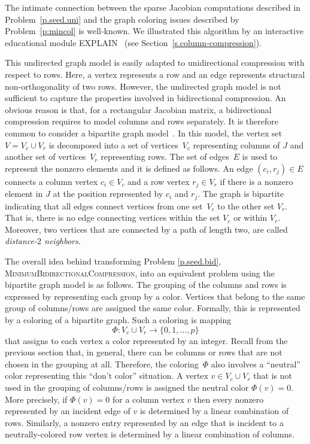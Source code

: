 \documentclass[12pt, oneside]{book}
\newcommand{\MinBidCom}{\textsc{MinimumBidirectionalCompression}}
\begin{document}
The intimate connection between the sparse Jacobian computations described in
Problem~\ref{p.seed.uni} and the graph coloring issues described by Problem~\ref{p:mincol} is
well-known.
We illustrated this algorithm by an interactive educational module EXPLAIN~\cite{2013:05}
(see Section~\ref{s.column-compression}). 

This undirected graph model is easily adapted to unidirectional compression with respect
to rows. Here, a vertex represents a row and an edge represents structural
non-orthogonality of two rows. However, the undirected graph model is not sufficient to
capture the properties involved in bidirectional compression. An obvious reason is that,
for a rectangular Jacobian matrix, a bidirectional compression requires to model columns
and rows separately. It is therefore common to consider a bipartite graph
model~\cite{Coleman1996SaE,cv:ecs,hs:csj}. In this model, the vertex set $V=V_c\cup V_r$
is decomposed into a set of vertices~$V_c$ representing columns of $J$ and another set of
vertices~$V_r$ representing rows. The set of edges~$E$ is used to represent the nonzero
elements and it is defined as follows. An edge $(c_i , r_j) \in E$ connects a column
vertex $c_i \in V_c$ and a row vertex $r_j \in V_r$ if there is a nonzero element in $J$
at the position represented by $c_i$ and $r_j$. The graph is bipartite indicating that
all edges connect vertices from one set~$V_c$ to the other set $V_r$. That is, there is
no edge connecting vertices within the set $V_c$ or within $V_r$. Moreover, two vertices
that are connected by a path of length two, are called \emph{distance-$2$ neighbors}.

The overall idea behind transforming Problem \ref{p.seed.bid}, \MinBidCom, into an equivalent
problem using the bipartite graph model is as follows. The grouping of the columns and
rows is expressed by representing each group by a color. Vertices that belong to the same
group of columns/rows are assigned the same color. Formally, this is represented by a
coloring of a bipartite graph. Such a coloring is mapping
$$
\Phi:V_c \cup V_r \to \{0,1,\dots ,p\}
$$
that assigns to each vertex a color represented by an integer. Recall from the previous
section that, in general, there can be columns or rows that are not chosen in the
grouping at all. Therefore, the coloring~$\Phi$ also involves a ``neutral'' color
representing this ``don't color'' situation. A vertex $v \in V_c \cup V_r$ that is not
used in the grouping of columns/rows is assigned the neutral color $\Phi(v)=0$. More
precisely, if $\Phi(v)=0$ for a column vertex $v$ then every nonzero represented by an
incident edge of $v$ is determined by a linear combination of rows. Similarly, a nonzero
entry represented by an edge that is incident to a neutrally-colored row vertex is
determined by a linear combination of columns.
\end{document}
